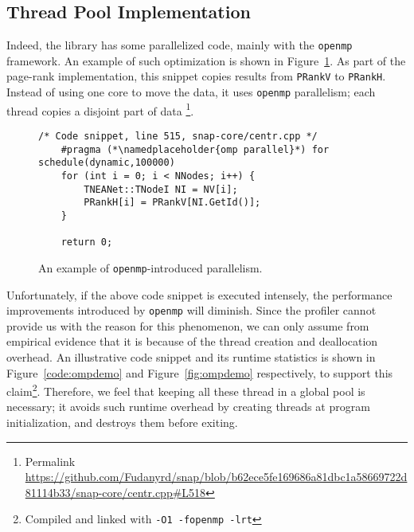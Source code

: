 \subsection{Thread Pool Implementation}
\label{sec:impl:tp}

\par Indeed, the \snap library has some parallelized code, mainly 
with the \texttt{openmp} framework\citep{openmp,embedded-hps}. An example
of such optimization is shown in Figure~\ref{code:openmp}. As part of the page-rank
implementation, this snippet copies results from \texttt{PRankV} to \texttt{PRankH}.
Instead of using one core to move the data, it uses \texttt{openmp} parallelism; 
each  thread copies a disjoint part of data
\footnote{Permalink 
\url{https://github.com/Fudanyrd/snap/blob/b62ece5fe169686a81dbc1a58669722d81114b33/snap-core/centr.cpp\#L518}}.

\begin{figure}[ht]
    \centering
\begin{lstlisting}[frame=tlbr]
    /* Code snippet, line 515, snap-core/centr.cpp */
    #pragma (*\namedplaceholder{omp parallel}*) for schedule(dynamic,100000)
    for (int i = 0; i < NNodes; i++) {
        TNEANet::TNodeI NI = NV[i];
        PRankH[i] = PRankV[NI.GetId()];
    }

    return 0;
\end{lstlisting}
    \caption{An example of \texttt{openmp}-introduced parallelism.}
    \label{code:openmp}
\end{figure}

\par Unfortunately, if the above code snippet is executed intensely, the 
performance improvements introduced by \texttt{openmp} will diminish. Since 
the profiler cannot provide us with the reason for this phenomenon, we can
only assume from empirical evidence that it is because of the thread creation 
and deallocation overhead. An illustrative code snippet and its runtime
statistics is shown in Figure~\ref{code:ompdemo} and Figure~\ref{fig:ompdemo} respectively,
to support this claim\footnote{Compiled and linked with \texttt{-O1 -fopenmp -lrt}}.
Therefore, we feel that keeping all these thread in a global pool is necessary;
it avoids such runtime overhead by creating threads at program initialization,
and destroys them before exiting.

